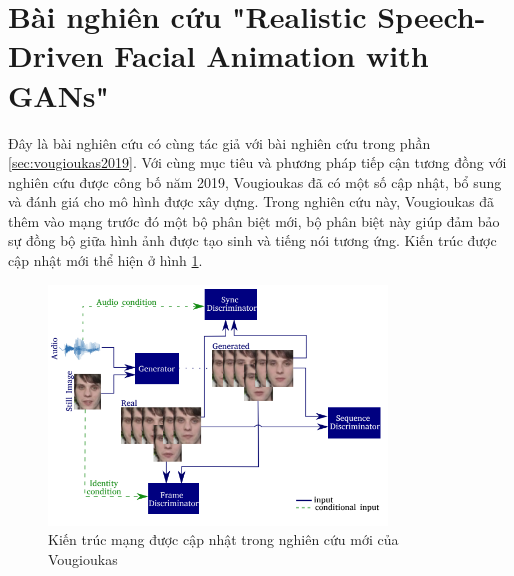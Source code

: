 
\section{Bài nghiên cứu "Realistic Speech-Driven Facial Animation with GANs"\cite{vougioukas2020}}

Đây là bài nghiên cứu có cùng tác giả với bài nghiên cứu trong phần \ref{sec:vougioukas2019}. Với cùng mục tiêu và phương pháp tiếp cận tương đồng với nghiên cứu được công bố  năm 2019, Vougioukas đã có một số cập nhật, bổ sung và đánh giá cho mô hình được xây dựng. Trong nghiên cứu này, Vougioukas đã thêm vào mạng trước đó một bộ phân biệt mới, bộ phân biệt này giúp đảm bảo sự đồng bộ giữa hình ảnh được tạo sinh và tiếng nói tương ứng. Kiến trúc được cập nhật mới thể hiện ở hình \ref{fig:vou2020_model}.

\begin{figure}[H]
    \centering
    \includegraphics[width=9cm]{./content/images/vou2020_model.png}
    \caption{Kiến trúc mạng được cập nhật trong nghiên cứu mới của Vougioukas}
    \label{fig:vou2020_model}
\end{figure}

